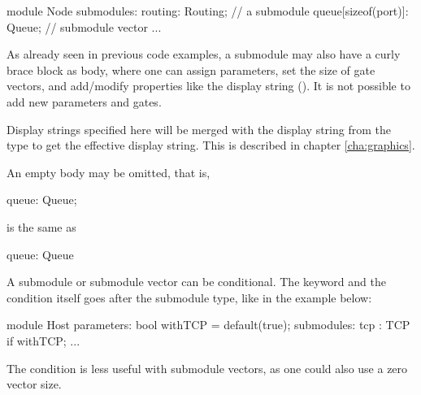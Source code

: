 \begin{ned}
module Node
{
    submodules:
        routing: Routing;   // a submodule
        queue[sizeof(port)]: Queue;  // submodule vector
        ...
}
\end{ned}

As already seen in previous code examples, a submodule may also have a
curly brace block as body, where one can assign parameters, set the size of gate vectors, and add/modify
properties like the display string (). It is not possible to
add new parameters and gates.

Display strings specified here will be merged with the display string
from the type to get the effective display string. This is described
in chapter \ref{cha:graphics}.


An empty body may be omitted, that is,

\begin{ned}
      queue: Queue;
\end{ned}

is the same as

\begin{ned}
      queue: Queue {
      }
\end{ned}

A submodule or submodule vector can be conditional. The 
keyword and the condition itself goes after the submodule type, like in the
example below:

\begin{ned}
module Host
{
    parameters:
        bool withTCP = default(true);
    submodules:
        tcp : TCP if withTCP;
        ...
}
\end{ned}

The condition is less useful with submodule vectors, as one could also
use a zero vector size.


